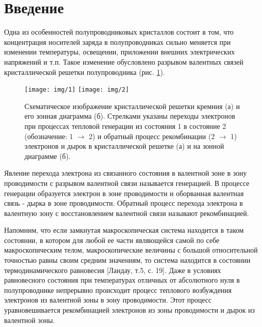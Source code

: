 

\def\labauthors{Карусевич А.А, Понур К.А.}
\def\labgroup{430}
\def\department{Кафедра электроники и квантовой физики}
\def\labnumber{1}
\def\labtheme{Движение носителей заряда в электрических и магнитных полях}

\renewcommand{\phi}{\varphi}
\renewcommand{\cftsecleader}{\cftdotfill{\cftdotsep}} %
\newcommand\Smat{\hat { \mathbf { S } }}
\let\tempint\int
\renewcommand{\int}{\tempint\limits}


\section*{Введение}

Одна из особенностей полупроводниковых кристаллов состоит в том, что концентрация носителей заряда в полупроводниках сильно меняется при изменении температуры, освещении, приложении внешних электрических напряжений и т.п. Такое изменение обусловлено разрывом валентных связей кристаллической решетки полупроводника (рис. \ref{fig:figure1}).
\begin{figure}[H]
	\centering
	\texttt{[image: img/1]}
	\texttt{[image: img/2]}
	\caption{Схематическое изображение кристаллической решетки кремния (а) и его зонная диаграмма (б). Стрелками указаны переходы электронов при процессах тепловой генерации из состояния 1 в состояние 2 (обозначение: 1 $\to$ 2) и обратный процесс рекомбинации (2 $\to$ 1) электронов и дырок в кристаллической решетке (а) и на зонной диаграмме (б).}
	\label{fig:figure1}
\end{figure}

Явление перехода электрона из связанного состояния в валентной зоне в зону проводимости с разрывом валентной связи называется генерацией. В процессе генерации образуется электрон в зоне проводимости и оборванная валентная связь - дырка в зоне проводимости. Обратный процесс перехода электрона в валентную зону с восстановлением валентной связи называют рекомбинацией.

Напомним, что если замкнутая макроскопическая система находится в таком состоянии, в котором для любой ее части являющейся самой по себе макроскопическим телом, макроскопические величины с большой относительной точностью равны своим средним значениям, то система находится в состоянии термодинамического равновесия [Ландау, т.5, с. 19]. Даже в условиях равновесного состояния при температурах отличных от абсолютного нуля в полупроводнике непрерывно происходит процесс теплового возбуждения электронов из валентной зоны в зону проводимости. Этот процесс уравновешивается рекомбинацией электронов из зоны проводимости и дырок из валентной зоны.

